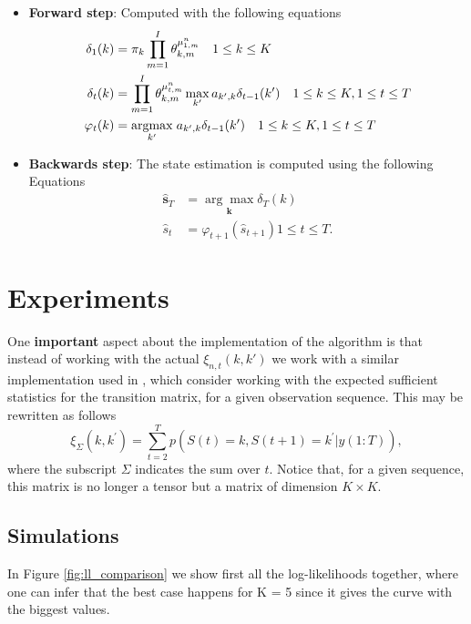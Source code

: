 \documentclass[12pt]{article}
\begin{document}
\begin{itemize}
	\item \textbf{Forward step}: Computed with the following equations
	\begin{align}
	\delta_{1}(k)&=\pi_{k} \prod\limits_{m=1}^{I}\theta_{k,m}^{\mu^{n}_{1,m}} \quad 1 \leq k \leq K\\
	\delta_{t}(k)&=\prod\limits_{m=1}^{I}\theta_{k,m}^{\mu^{n}_{t,m}} \max _{k'} a_{k',k} \delta_{t-1}(k') \quad 1 \leq k \leq K , 1 \leq t \leq T \\
	\varphi_{t}(k)&=\underset{k'}{\operatorname{argmax}} \hspace{0.1cm}a_{k',k} \delta_{t-1}(k') \quad 1 \leq k \leq K , 1 \leq t \leq T \\
	\end{align}
	\item \textbf{Backwards step}: The state estimation is computed using the following Equations
	\begin{align}
	\hat{\mathbf{s}}_{T}&=\underset{\boldsymbol{k}}{\arg \max } \delta_{T}(k)\\
	\hat{s}_{t}&=\varphi_{t+1}\left(\hat{s}_{t+1}\right)  1 \leq t \leq T.
	\end{align} 
\end{itemize}

\section{Experiments}


\noindent One \textbf{important} aspect about the implementation of the algorithm is that instead of working with the actual $\xi _ { n,t } ( k , k' )$ we work with a similar implementation used in \cite{murphy2012machine}, which consider working with the expected sufficient statistics for the transition matrix, for a given observation sequence. This may be rewritten as follows
\begin{equation}
\xi_\Sigma(k,k^{\prime}) = \sum\limits_{t=2}^{T} p(S(t) = k, S(t+1) = k^{\prime} | y(1:T)),
\end{equation}
where the subscript $\Sigma$ indicates the sum over $t$. Notice that, for a given sequence, this matrix is no longer a tensor but a matrix of dimension $K\times K$.

\subsection{Simulations}
In Figure \ref{fig:ll_comparison} we show first all the log-likelihoods together, where one can infer that the best case happens for K = 5 since it gives the curve with the biggest values.
\end{document}
